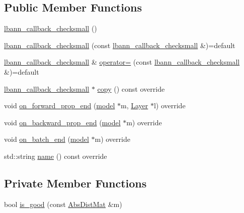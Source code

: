 \subsection*{Public Member Functions}
\begin{DoxyCompactItemize}
\item 
\hyperlink{classlbann_1_1lbann__callback__checksmall_a2a5769a9309807f6952212d5ea3a4466}{lbann\+\_\+callback\+\_\+checksmall} ()
\item 
\hyperlink{classlbann_1_1lbann__callback__checksmall_a8e08286cc2ded6e47297f76fcdbf8f32}{lbann\+\_\+callback\+\_\+checksmall} (const \hyperlink{classlbann_1_1lbann__callback__checksmall}{lbann\+\_\+callback\+\_\+checksmall} \&)=default
\item 
\hyperlink{classlbann_1_1lbann__callback__checksmall}{lbann\+\_\+callback\+\_\+checksmall} \& \hyperlink{classlbann_1_1lbann__callback__checksmall_a9488b223c8ae4beb87a6bd6d01c6d14d}{operator=} (const \hyperlink{classlbann_1_1lbann__callback__checksmall}{lbann\+\_\+callback\+\_\+checksmall} \&)=default
\item 
\hyperlink{classlbann_1_1lbann__callback__checksmall}{lbann\+\_\+callback\+\_\+checksmall} $\ast$ \hyperlink{classlbann_1_1lbann__callback__checksmall_ae0601cd90b165049063783d4d501ffde}{copy} () const override
\item 
void \hyperlink{classlbann_1_1lbann__callback__checksmall_a2f50695feb1444145bae251f2e94b721}{on\+\_\+forward\+\_\+prop\+\_\+end} (\hyperlink{classlbann_1_1model}{model} $\ast$m, \hyperlink{classlbann_1_1Layer}{Layer} $\ast$l) override
\item 
void \hyperlink{classlbann_1_1lbann__callback__checksmall_aade56a328c4b9df28c0cd979eed9e5ff}{on\+\_\+backward\+\_\+prop\+\_\+end} (\hyperlink{classlbann_1_1model}{model} $\ast$m) override
\item 
void \hyperlink{classlbann_1_1lbann__callback__checksmall_a00f1e6ad712638a107667a3e6695a6f0}{on\+\_\+batch\+\_\+end} (\hyperlink{classlbann_1_1model}{model} $\ast$m) override
\item 
std\+::string \hyperlink{classlbann_1_1lbann__callback__checksmall_acbdd897ecbe5a27b59db15ae7662e0f9}{name} () const override
\end{DoxyCompactItemize}
\subsection*{Private Member Functions}
\begin{DoxyCompactItemize}
\item 
bool \hyperlink{classlbann_1_1lbann__callback__checksmall_afe78f539ba3b2ad3e6ae8c468850052c}{is\+\_\+good} (const \hyperlink{base_8hpp_a9a697a504ae84010e7439ffec862b470}{Abs\+Dist\+Mat} \&m)
\end{DoxyCompactItemize}
